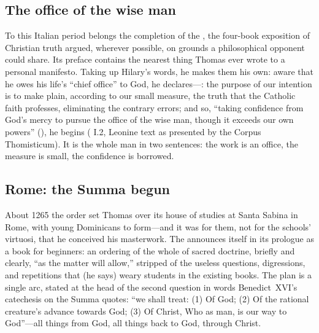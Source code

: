 \subsection{The office of the wise man}

To this Italian period belongs the completion of the , the four-book exposition of Christian truth argued, wherever
possible, on grounds a philosophical opponent could share. Its preface
contains the nearest thing Thomas ever wrote to a personal manifesto.
Taking up Hilary's words, he makes them his own: aware that he owes his
life's ``chief office'' to God, he declares---: the purpose of our
intention is to make plain, according to our small measure, the truth
that the Catholic faith professes, eliminating the contrary errors; and
so, ``taking confidence from God's mercy to pursue the office of the wise
man, though it exceeds our own powers'' (), he begins ( I.2,
Leonine text as presented by the Corpus Thomisticum). It is the whole
man in two sentences: the work is an office, the measure is small, the
confidence is borrowed.

\subsection{Rome: the Summa begun}

About 1265 the order set Thomas over its house of studies at Santa Sabina
in Rome, with young Dominicans to form---and it was for them, not for the
schools' virtuosi, that he conceived his masterwork. The  announces itself in its prologue as a book for beginners: an
ordering of the whole of sacred doctrine, briefly and clearly, ``as the
matter will allow,'' stripped of the useless questions, digressions, and
repetitions that (he says) weary students in the existing books. The plan
is a single arc, stated at the head of the second question in words
Benedict~XVI's catechesis on the Summa quotes: ``we shall treat: (1) Of
God; (2) Of the rational creature's advance towards God; (3) Of Christ,
Who as man, is our way to God''---all things from God, all things back to
God, through Christ.

